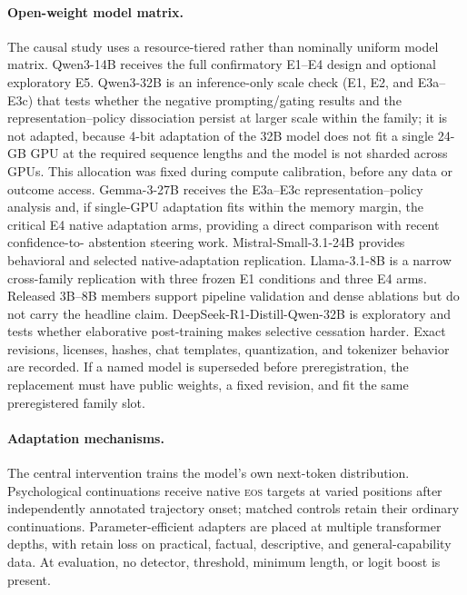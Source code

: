 \documentclass[10pt,twocolumn]{article}
\newcommand{\EOS}{\textsc{eos}}
\begin{document}
\paragraph{Open-weight model matrix.}
The causal study uses a resource-tiered rather than nominally uniform model
matrix. Qwen3-14B receives the full confirmatory E1--E4 design and optional
exploratory E5. Qwen3-32B is an inference-only scale check (E1, E2, and
E3a--E3c) that tests whether the negative prompting/gating results and the
representation--policy dissociation persist at larger scale within the family;
it is not adapted, because 4-bit adaptation of the 32B model does not fit a
single 24-GB GPU at the required sequence lengths and the model is not sharded
across GPUs. This allocation was fixed during compute calibration, before any
data or outcome access. Gemma-3-27B
receives the E3a--E3c representation--policy analysis and, if single-GPU
adaptation fits within the memory margin, the critical E4 native adaptation arms, providing a direct comparison with recent confidence-to-
abstention steering work. Mistral-Small-3.1-24B provides behavioral and selected
native-adaptation replication. Llama-3.1-8B is a narrow cross-family replication
with three frozen E1 conditions and three E4 arms. Released 3B--8B members support
pipeline validation and dense ablations but do not carry the headline claim.
DeepSeek-R1-Distill-Qwen-32B is exploratory and tests whether elaborative
post-training makes selective cessation harder. Exact revisions, licenses,
hashes, chat templates, quantization, and tokenizer behavior are recorded. If a
named model
is superseded before preregistration, the replacement must have public weights,
a fixed revision, and fit the same preregistered family slot.

\paragraph{Adaptation mechanisms.}

The central intervention trains the model's own next-token distribution.
Psychological continuations receive native \EOS{} targets at varied positions
after independently annotated trajectory onset; matched controls retain their
ordinary continuations. Parameter-efficient adapters are placed at multiple
transformer depths, with retain loss on practical, factual, descriptive, and
general-capability data. At evaluation, no detector, threshold, minimum length,
or logit boost is present.
\end{document}

